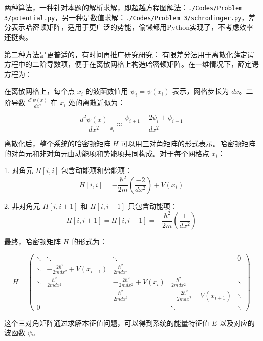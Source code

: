 两种算法，一种针对本题的解析求解，即超越方程图解法：\texttt{./Codes/Problem 3/potential.py}，另一种是数值求解：\texttt{./Codes/Problem 3/schrodinger.py}，差分表示哈密顿矩阵，适用于更广泛的势能，偷懒都用Python实现了，不考虑效率还挺爽。

第二种方法是更普适的，有时间再推广研究研究：
有限差分法用于离散化薛定谔方程中的二阶导数项，便于在离散网格上构造哈密顿矩阵。在一维情况下，薛定谔方程为：


在离散网格上，每个点 \(x_i\) 的波函数值用 \(\psi_i = \psi(x_i)\) 表示，网格步长为 \(dx\)。二阶导数 \(\frac{d^2 \psi(x)}{dx^2}\) 在 \(x_i\) 处的离散近似为：

\[
    \frac{d^2 \psi(x)}{dx^2} \Big|_{x_i} \approx \frac{\psi_{i+1} - 2\psi_i + \psi_{i-1}}{dx^2}
\]

离散化后，整个系统的哈密顿矩阵 \(H\) 可以用三对角矩阵的形式表示。哈密顿矩阵的对角元和非对角元由动能项和势能项共同构成。对于每个网格点 \(x_i\)：

1. 对角元 \(H[i, i]\) 包含动能项和势能项：
\[
    H[i, i] = -\frac{\hbar^2}{2m} \left( \frac{-2}{dx^2} \right) + V(x_i)
\]

2. 非对角元 \(H[i, i+1]\) 和 \(H[i, i-1]\) 只包含动能项：
\[
    H[i, i+1] = H[i, i-1] = -\frac{\hbar^2}{2m} \left( \frac{1}{dx^2} \right)
\]

最终，哈密顿矩阵 \(H\) 的形式为：

\[
    H = \begin{pmatrix}
        \ddots & \ddots                                  & \ddots                              &                                         & 0      \\
        \ddots & -\frac{2 \hbar^2}{2m dx^2} + V(x_{i-1}) & \frac{\hbar^2}{2m dx^2}             &                                         &        \\
        \ddots & \frac{\hbar^2}{2m dx^2}                 & -\frac{2 \hbar^2}{2m dx^2} + V(x_i) & \frac{\hbar^2}{2m dx^2}                 & \ddots \\
               &                                         & \frac{\hbar^2}{2m dx^2}             & -\frac{2 \hbar^2}{2m dx^2} + V(x_{i+1}) & \ddots \\
        0      &                                         &                                     & \ddots                                  & \ddots
    \end{pmatrix}
\]

这个三对角矩阵通过求解本征值问题，可以得到系统的能量特征值 \(E\) 以及对应的波函数 \(\psi\)。

